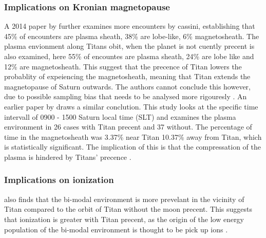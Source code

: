 \documentclass[12pt, parskip=full*, abstract]{scrartcl}
\begin{document}
\subsubsection{Implications on Kronian magnetopause}
A 2014 paper by \textcite{Smith-WithOrWithoutTitan} further examines more encounters by cassini, establishing that 45\% of encounters are plasma sheath, 38\% are lobe-like, 6\% magnetosheath. The plasma envionment along Titans obit, when the planet is not cuently precent is also examined, here 55\% of encountes are plasma sheath, 24\% are lobe like and 12\% are magnetosheath. This suggest that the precence of Titan lowers the probablity of expeiencing the magnetosheath, meaning that Titan extends the magnetopause of Saturn outwards.
The authors cannot conclude this however, due to possible sampling bias that needs to be analysed more rigouresly \parencite{Smith-WithOrWithoutTitan}. An earlier paper by \textcite{Wei-WithOrWithoutTitan} draws a similar conclution. This study looks at the specific time intervall of 0900 - 1500 Saturn local time (SLT) and examines the plasma environment in 26 cases with Titan precent and 37 without. The percentage of time in the magnetosheath was 3.37\% near Titan 10.37\% away from Titan, which is statistically significant. The implication of this is that the compressation of the plasma is hindered by Titans' precence \parencite{Wei-WithOrWithoutTitan}.  

\subsubsection{Implications on ionization}
\textcite{Smith-WithOrWithoutTitan} also finds that the bi-modal environment is more prevelant in the vicinity of Titan compared to the orbit of Titan without the moon precent. This suggests that ionization is greater with Titan precent, as the origin of the low energy population of the bi-modal environment is thought to be pick up ions \parencite{Smith-WithOrWithoutTitan}. 
\end{document}
